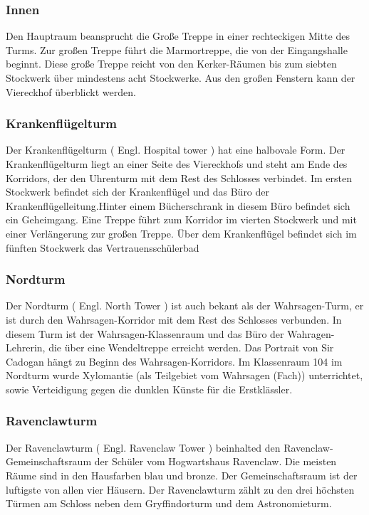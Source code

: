 \documentclass[a4paper, 10pt]{article}
\begin{document}
\subsubsection*{\large Innen}
Den Hauptraum beansprucht die Große Treppe in einer rechteckigen Mitte des Turms. Zur großen Treppe führt die Marmortreppe, die von der Eingangshalle beginnt. Diese große Treppe reicht von den Kerker-Räumen bis zum siebten Stockwerk über mindestens acht Stockwerke. Aus den großen Fenstern kann der Viereckhof überblickt werden.
\subsubsection*{\large Krankenflügelturm}
Der Krankenflügelturm (  Engl.  Hospital tower ) hat eine halbovale Form. Der Krankenflügelturm liegt an einer Seite des Viereckhofs und steht am Ende des Korridors, der den Uhrenturm mit dem Rest des Schlosses verbindet. Im ersten Stockwerk befindet sich der Krankenflügel und das Büro der Krankenflügelleitung.Hinter einem Bücherschrank in diesem Büro befindet sich ein Geheimgang.
\vspace{10pt}
\newline
Eine Treppe führt zum Korridor im vierten Stockwerk und mit einer Verlängerung zur großen Treppe. Über dem Krankenflügel befindet sich im fünften Stockwerk das Vertrauensschülerbad
\subsubsection*{\large Nordturm}
Der Nordturm (  Engl.  North Tower ) ist auch bekant als der Wahrsagen-Turm, er ist durch den Wahrsagen-Korridor mit dem Rest des Schlosses verbunden. In diesem Turm ist der Wahrsagen-Klassenraum und das Büro der Wahragen-Lehrerin, die über eine Wendeltreppe erreicht werden. Das Portrait von Sir Cadogan hängt zu Beginn des Wahrsagen-Korridors.
\vspace{10pt}
\newline
Im Klassenraum 104 im Nordturm wurde Xylomantie (als Teilgebiet vom Wahrsagen (Fach)) unterrichtet, sowie Verteidigung gegen die dunklen Künste für die Erstklässler.
\subsubsection*{\large Ravenclawturm}
Der Ravenclawturm (  Engl.  Ravenclaw Tower ) beinhalted den Ravenclaw-Gemeinschaftsraum der Schüler vom Hogwartshaus Ravenclaw. Die meisten Räume sind in den Hausfarben blau und bronze. Der Gemeinschaftsraum ist der luftigste von allen vier Häusern.
\vspace{10pt}
\newline
Der Ravenclawturm zählt zu den drei höchsten Türmen am Schloss neben dem Gryffindorturm und dem Astronomieturm.
\end{document}
